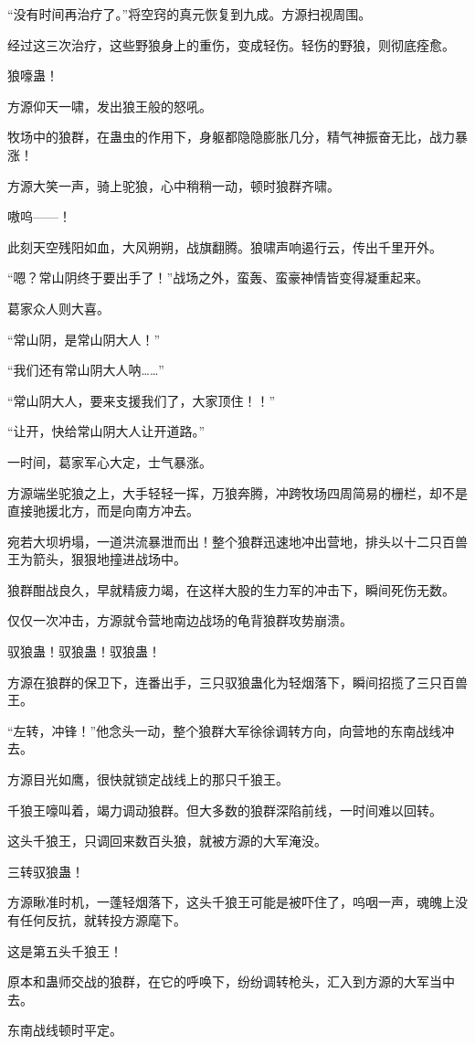 \begin{this_body}
“没有时间再治疗了。”将空窍的真元恢复到九成。方源扫视周围。

经过这三次治疗，这些野狼身上的重伤，变成轻伤。轻伤的野狼，则彻底痊愈。

狼嚎蛊！

方源仰天一啸，发出狼王般的怒吼。

牧场中的狼群，在蛊虫的作用下，身躯都隐隐膨胀几分，精气神振奋无比，战力暴涨！

方源大笑一声，骑上驼狼，心中稍稍一动，顿时狼群齐啸。

嗷呜——！

此刻天空残阳如血，大风朔朔，战旗翻腾。狼啸声响遏行云，传出千里开外。

“嗯？常山阴终于要出手了！”战场之外，蛮轰、蛮豪神情皆变得凝重起来。

葛家众人则大喜。

“常山阴，是常山阴大人！”

“我们还有常山阴大人呐……”

“常山阴大人，要来支援我们了，大家顶住！！”

“让开，快给常山阴大人让开道路。”

一时间，葛家军心大定，士气暴涨。

方源端坐驼狼之上，大手轻轻一挥，万狼奔腾，冲跨牧场四周简易的栅栏，却不是直接驰援北方，而是向南方冲去。

宛若大坝坍塌，一道洪流暴泄而出！整个狼群迅速地冲出营地，排头以十二只百兽王为箭头，狠狠地撞进战场中。

狼群酣战良久，早就精疲力竭，在这样大股的生力军的冲击下，瞬间死伤无数。

仅仅一次冲击，方源就令营地南边战场的龟背狼群攻势崩溃。

驭狼蛊！驭狼蛊！驭狼蛊！

方源在狼群的保卫下，连番出手，三只驭狼蛊化为轻烟落下，瞬间招揽了三只百兽王。

“左转，冲锋！”他念头一动，整个狼群大军徐徐调转方向，向营地的东南战线冲去。

方源目光如鹰，很快就锁定战线上的那只千狼王。

千狼王嚎叫着，竭力调动狼群。但大多数的狼群深陷前线，一时间难以回转。

这头千狼王，只调回来数百头狼，就被方源的大军淹没。

三转驭狼蛊！

方源瞅准时机，一蓬轻烟落下，这头千狼王可能是被吓住了，呜咽一声，魂魄上没有任何反抗，就转投方源麾下。

这是第五头千狼王！

原本和蛊师交战的狼群，在它的呼唤下，纷纷调转枪头，汇入到方源的大军当中去。

东南战线顿时平定。

\end{this_body}

